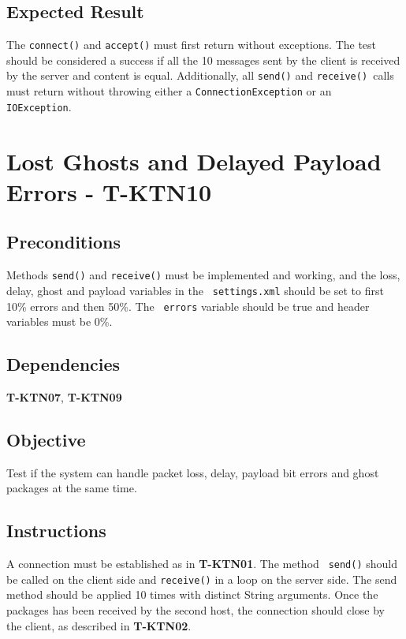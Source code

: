 \documentclass{article}
\begin{document}
\subsection{Expected Result}

The \texttt{connect()} and \texttt{accept()} must first return without
exceptions. The test should be considered a success if all the 10 messages
sent by the client is received by the server and content is equal.
Additionally, all \texttt{send()} and \texttt{receive() }calls must return
without throwing either a \texttt{ConnectionException} or an \texttt{%
IOException}.

\section{Lost Ghosts and Delayed Payload Errors - T-KTN10}

\subsection{Preconditions}

Methods \texttt{send()} and \texttt{receive()} must be implemented and
working, and the loss, delay, ghost and payload variables in the \texttt{%
settings.xml} should be set to first 10\% errors and then 50\%. The \texttt{%
errors} variable should be true and header variables must be 0\%.

\subsection{Dependencies}

\textbf{T-KTN07}, \textbf{T-KTN09}

\subsection{Objective}

Test if the system can handle packet loss, delay, payload bit errors and
ghost packages at the same time.

\subsection{Instructions}

A connection must be established as in \textbf{T-KTN01}. The method \texttt{%
send()} should be called on the client side and \texttt{receive()} in a loop
on the server side. The send method should be applied 10 times with distinct
String arguments. Once the packages has been received by the second host,
the connection should close by the client, as described in \textbf{T-KTN02}.
\end{document}
